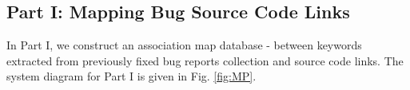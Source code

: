 \documentclass{sig-alternate}
\begin{document}
%
 
\subsection{Part I: Mapping Bug Source Code Links}
In Part I, we construct an association map database - between keywords extracted from previously fixed bug reports collection and source code links. The system diagram for Part I is given in Fig. \ref{fig:MP}.
\end{document}
